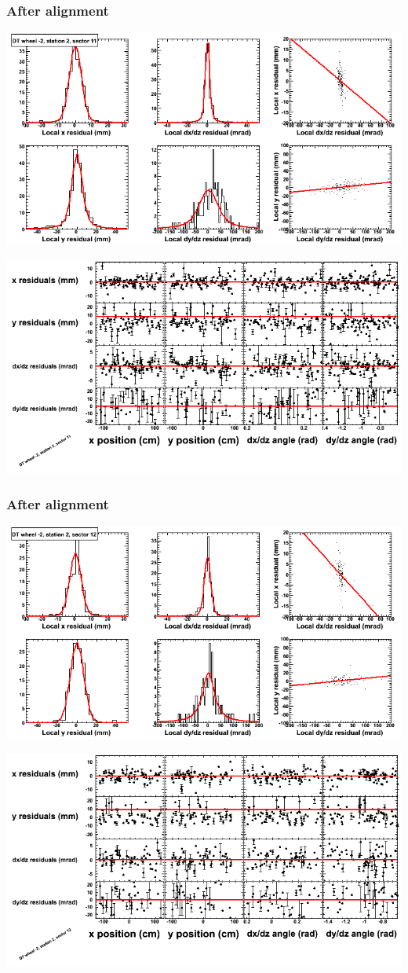 \documentclass[compress]{beamer}
\begin{document}
\begin{frame}
\frametitle{After alignment}
\includegraphics[width=0.7\linewidth]{NOV4_fitfunctions/MBwhAst2sec11_bellcurves.png}

\includegraphics[width=0.7\linewidth]{NOV4_fitfunctions/MBwhAst2sec11_polynomials.png}
\end{frame}

\begin{frame}
\frametitle{After alignment}
\includegraphics[width=0.7\linewidth]{NOV4_fitfunctions/MBwhAst2sec12_bellcurves.png}

\includegraphics[width=0.7\linewidth]{NOV4_fitfunctions/MBwhAst2sec12_polynomials.png}
\end{frame}
\end{document}
